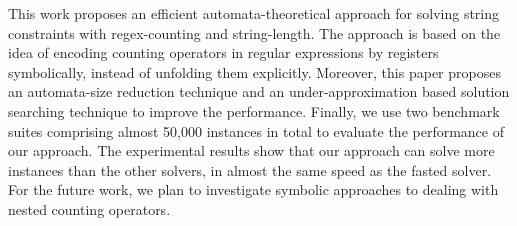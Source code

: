 %

This work proposes an efficient automata-theoretical approach for solving string constraints with regex-counting and string-length. The approach is based on the idea of encoding counting operators in regular expressions by registers symbolically, instead of unfolding them explicitly. Moreover, this paper proposes an automata-size reduction technique and an under-approximation based solution searching technique to improve the performance. Finally, we use two benchmark suites comprising almost 50,000 instances in total to evaluate the performance of our approach. The experimental results show that our approach can solve more instances than the other solvers, in almost the same speed as the fasted solver. 
For the future work, we plan to investigate symbolic approaches to dealing with nested counting operators. 




%